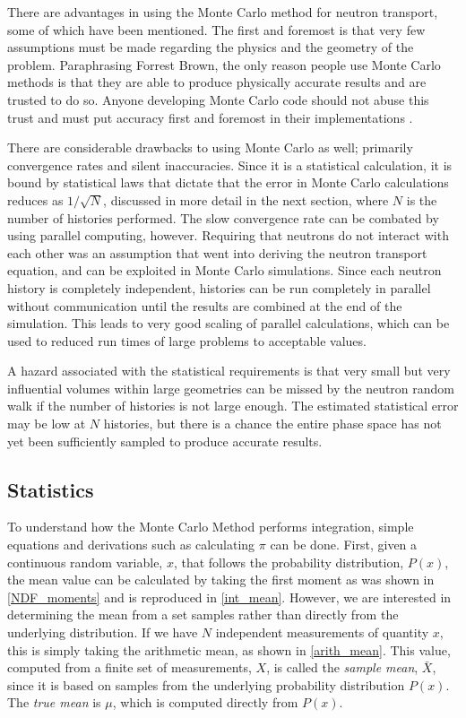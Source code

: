 There are advantages in using the Monte Carlo method for neutron transport, some of which have been mentioned.  The first and foremost is that very few assumptions must be made regarding the physics and the geometry of the problem. Paraphrasing Forrest Brown, the only reason people use Monte Carlo methods is that they are able to produce physically accurate results and are trusted to do so.  Anyone developing Monte Carlo code should not abuse this trust and must put accuracy first and foremost in their implementations \cite{fb_snamc}.

There are considerable drawbacks to using Monte Carlo as well; primarily convergence rates and silent inaccuracies.  Since it is a statistical calculation, it is bound by statistical laws that dictate that the error in Monte Carlo calculations reduces as $1/\sqrt{N}$, discussed in more detail in the next section, where $N$ is the number of histories performed.  The slow convergence rate can be combated by using parallel computing, however.  Requiring that neutrons do not interact with each other was an assumption that went into deriving the neutron transport equation, and can be exploited in Monte Carlo simulations.  Since each neutron history is completely independent, histories can be run completely in parallel without communication until the results are combined at the end of the simulation.  This leads to very good scaling of parallel calculations, which can be used to reduced run times of large problems to acceptable values.

A hazard associated with the statistical requirements is that very small but very influential volumes within large geometries can be missed by the neutron random walk if the number of histories is not large enough.  The estimated statistical error may be low at $N$ histories, but there is a chance the entire phase space has not yet been sufficiently sampled to produce accurate results.  

\subsection{Statistics}
\label{sec:stat}

To understand how the Monte Carlo Method performs integration, simple equations and derivations such as calculating $\pi$ can be done.   First, given a continuous random variable, $x$, that follows the probability distribution, $P(x)$, the mean value can be calculated by taking the first moment as was shown in \eqref{NDF_moments} and is reproduced in \eqref{int_mean}.  However, we are interested in determining the mean from a set samples rather than directly from the underlying distribution.  If we have $N$ independent measurements of quantity $x$, this is simply taking the arithmetic mean, as shown in \eqref{arith_mean}.  This value, computed from a finite set of measurements, $X$, is called the \emph{sample mean}, $\bar{X}$, since it is based on samples from the underlying probability distribution $P(x)$.  The \emph{true mean} is $\mu$, which is computed directly from $P(x)$. 

